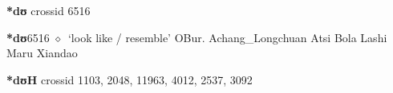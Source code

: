 \item
\textbf{*dʊ}
  {\tiny crossid 6516}
  \begin{list}{}{\leftmargin=1.5em \itemindent=-1.5em}
  \item {\footnotesize \textbf{*dʊ}}{\tiny 6516}
         $\diamond$~`look like / resemble'
         OBur. 
\hspace{1ex}
         Achang\_Longchuan 
\hspace{1ex}
         Atsi 
\hspace{1ex}
         Bola 
\hspace{1ex}
         Lashi 
\hspace{1ex}
         Maru 
\hspace{1ex}
         Xiandao 
  \end{list}
\item
\textbf{*dʊH}
  {\tiny crossid 1103, 2048, 11963, 4012, 2537, 3092}
